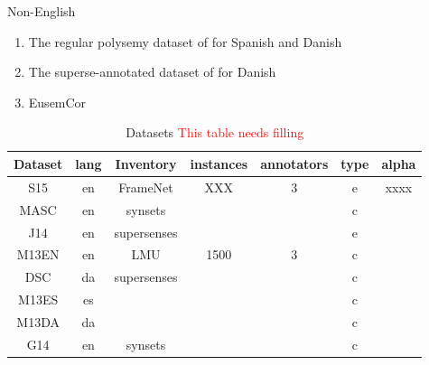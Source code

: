 \documentclass[11pt,a4paper]{article}
\begin{document}
Non-English
\begin{enumerate}[noitemsep]
\item The regular polysemy dataset of \cite{MartinezAlonso2013} for Spanish and Danish
\item The superse-annotated dataset of \cite{MartinezAlonso2015} for Danish
\item EusemCor 
\end{enumerate}

\begin{table}[Ht!]

\begin{center}
  \begin{tabular}{ccccccc}
  \toprule 

Dataset& lang & Inventory & instances & annotators & type &alpha \\ 
\midrule 

S15 & en & FrameNet & XXX & 3 & e & xxxx \\
MASC & en & synsets & & & c & \\
J14 & en & supersenses  & & & e & \\
M13EN & en & LMU & 1500 & 3 & c&  \\
DSC & da & supersenses &    &  & c& \\
M13ES & es &  &  &  & c&  \\
M13DA & da &  &  &  & c&  \\
G14 & en &  synsets &  &  & c&  \\
\bottomrule

  \end{tabular}  
\end{center}
\caption{Datasets \label{tab:data} \textcolor{red}{This table needs filling}}
\end{table} 
\end{document}
